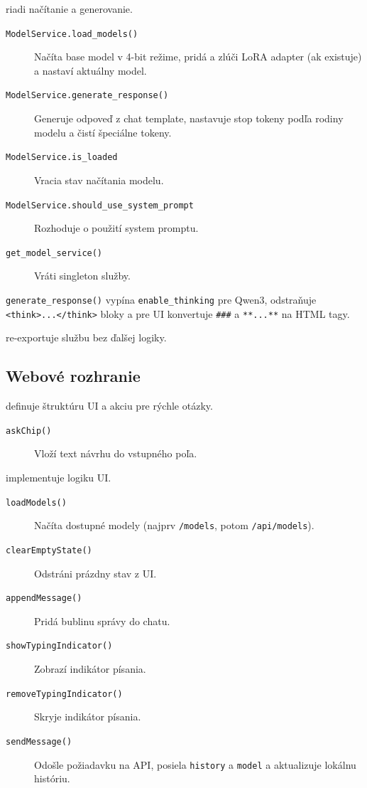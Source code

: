 \textbf{} riadi načítanie a generovanie.
\begin{description}
	\item[\texttt{ModelService.load\_models()}] Načíta base model v 4-bit režime, pridá a zlúči LoRA adapter (ak existuje) a nastaví aktuálny model.
	\item[\texttt{ModelService.generate\_response()}] Generuje odpoveď z chat template, nastavuje stop tokeny podľa rodiny modelu a čistí špeciálne tokeny.
	\item[\texttt{ModelService.is\_loaded}] Vracia stav načítania modelu.
	\item[\texttt{ModelService.should\_use\_system\_prompt}] Rozhoduje o použití system promptu.
	\item[\texttt{get\_model\_service()}] Vráti singleton služby.
\end{description}

\texttt{generate\_response()} vypína \texttt{enable\_thinking} pre Qwen3, odstraňuje \texttt{<think>...</think>} bloky a pre UI konvertuje \texttt{###} a \texttt{**...**} na HTML tagy.

\textbf{} re-exportuje službu bez ďalšej logiky.

\subsection{Webové rozhranie}

\textbf{} definuje štruktúru UI a akciu pre rýchle otázky.
\begin{description}
	\item[\texttt{askChip()}] Vloží text návrhu do vstupného poľa.
\end{description}

\textbf{} implementuje logiku UI.
\begin{description}
	\item[\texttt{loadModels()}] Načíta dostupné modely (najprv \texttt{/models}, potom \texttt{/api/models}).
	\item[\texttt{clearEmptyState()}] Odstráni prázdny stav z UI.
	\item[\texttt{appendMessage()}] Pridá bublinu správy do chatu.
	\item[\texttt{showTypingIndicator()}] Zobrazí indikátor písania.
	\item[\texttt{removeTypingIndicator()}] Skryje indikátor písania.
	\item[\texttt{sendMessage()}] Odošle požiadavku na API, posiela \texttt{history} a \texttt{model} a aktualizuje lokálnu históriu.
\end{description}

